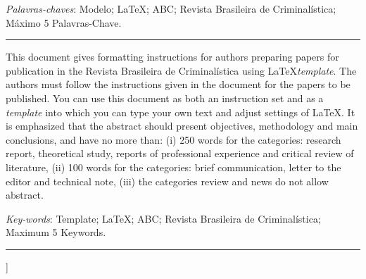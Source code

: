 \documentclass{RBClatex}
\begin{document}
\begin{@twocolumnfalse}
\begin{onecolabstract}
\vspace{6pt}

\noindent
\footnotesize\textit{Palavras-chaves}: Modelo; \LaTeX; ABC; Revista Brasileira de Criminalística; Máximo 5 Palavras-Chave.

\vspace{-2.5mm}
\noindent\rule{\textwidth}{0.1mm}

\end{onecolabstract}
\vspace{-4mm}
\renewcommand{\abstractname}{Abstract}

\begin{onecolabstract}

		\vspace{-1.5mm}
		\noindent
		This document gives formatting instructions for authors preparing papers for publication in the Revista Brasileira de Criminalística using \LaTeX \textit{template}. The authors must follow the instructions given in the document for the papers to be published. You can use this document as both an instruction set and as a \textit{template} into which you can type your own text and adjust settings of \LaTeX. It is emphasized that the abstract should present objectives, methodology and main conclusions, and have no more than: (i) 250 words for the categories: research report, theoretical study, reports of professional experience and critical review of literature, (ii) 100 words for the categories: brief communication, letter to the editor and technical note, (iii) the categories review and news do not allow abstract.
		
		\vspace{6pt}
		
		\noindent
		\footnotesize\textit{Key-words}: Template; \LaTeX; ABC; Revista Brasileira de Criminalística; Maximum 5 Keywords.
		
		\vspace{-2.5mm}
		\noindent\rule{\textwidth}{0.1mm}
\end{onecolabstract}
\vspace{2.5mm}
\end{@twocolumnfalse}
]				%


\end{document}
